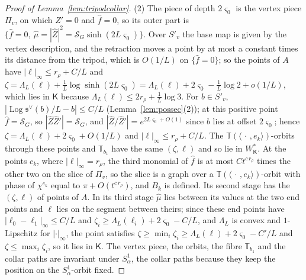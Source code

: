 \begin{proof}[Proof of Lemma~\ref{lem:tripodcollar}]
(2) The piece of depth $2\varsigma_0$ is the vertex piece $\Pi_v$, on which $Z'=0$ and $\hat f=0$, so its outer part is
$\{\hat f=0,\ \hat\mu=|\hat Z|^2=\mathcal S_G\sinh(2L\varsigma_0)\}$. Over $S'_v$ the base map is given by the vertex description,
and the retraction moves a point by at most a constant times its distance from the tripod, which is $O(1/L)$ on
$\{\hat f=0\}$; so the points of $A$ have $|\ell|_\infty\le r_\rho+C/L$ and
$\zeta=\Lambda_L(\ell)+\frac1L\log\sinh(2L\varsigma_0)=\Lambda_L(\ell)+2\varsigma_0-\frac1L\log2+o(1/L)$, which lies in $\mathsf K$ because
$\Lambda_L(\ell)\le2r_\rho+\frac1L\log3$. For $b\in S'_v$, $|\operatorname{Log}\mathfrak s^\vee(b)/L-b|\le C/L$ (Lemma~\ref{lem:possec}(2)); at
this positive point $\hat f=\mathcal S_G$, so $|\hat Z\hat Z'|=\mathcal S_G$, and $|\hat Z/\hat Z'|=e^{2L\varsigma_0+O(1)}$ since $b$
lies at offset $2\varsigma_0$; hence $\zeta=\Lambda_L(\ell)+2\varsigma_0+O(1/L)$ and $|\ell|_\infty\le r_\rho+C/L$. The
$\mathbb T(\langle\,\cdot\,,e_k\rangle)$-orbits through these points and $\mathbb T_{b_1}$ have the same $(\zeta,\ell)$ and so lie
in $W^*_{\mathsf K}$. At the points $c_k$, where $|\ell|_\infty=r_\rho$, the third monomial of $\hat f$ is at most $Ct^{c\,r_\rho}$ times
the other two on the slice of $\Pi_v$, so the slice is a graph over a $\mathbb T(\langle\,\cdot\,,e_k\rangle)$-orbit with phase
of $\chi^{e_k}$ equal to $\pi+O(t^{c\,r_\rho})$, and $B_k$ is defined. Its second stage has the $(\zeta,\ell)$ of points of $A$.
In its third stage $\hat\mu$ lies between its values at the two end points and $\ell$ lies on the segment between theirs;
since these end points have $|\ell_0-\ell_1|_\infty\le C/L$ and $\zeta_i\ge\Lambda_L(\ell_i)+2\varsigma_0-C/L$, and $\Lambda_L$ is
convex and $1$-Lipschitz for $|\cdot|_\infty$, the point satisfies $\zeta\ge\min_i\zeta_i\ge\Lambda_L(\ell)+2\varsigma_0-C'/L$ and
$\zeta\le\max_i\zeta_i$, so it lies in $\mathsf K$. The vertex piece, the orbits, the fibre $\mathbb T_{b_1}$ and the collar paths are
invariant under $S^1_\alpha$, the collar paths because they keep the position on the $S^1_\alpha$-orbit fixed.


\end{proof}
